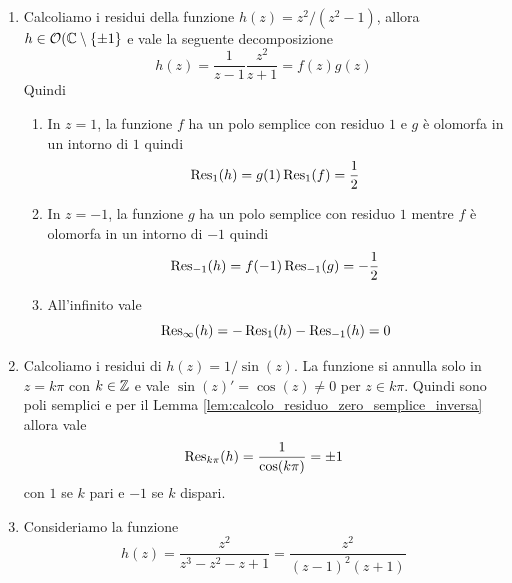 \begin{example}\
  \begin{enumerate}
    \item Calcoliamo i residui della funzione $h(z) = z^2 / (z^2 - 1)$, allora $h
        \in \mathcal{O}(\mathbb{C} \setminus \left\{ \pm 1 \right\}$ e vale la seguente
         decomposizione
         \begin{equation*}
            h(z) = \frac{1}{z-1} \frac{z^2}{z+1} = f(z)g(z)
         \end{equation*}
         Quindi 
         \begin{enumerate}
            \item In $z = 1$, la funzione $f$ ha un polo semplice con residuo $1$ e $g$
                è olomorfa in un intorno di $1$ quindi 
                \begin{equation*}
                    \operatorname{Res}_1(h) = g(1) \operatorname{Res}_1(f) = \frac{1}{2}
                \end{equation*}
            \item In $z = -1$, la funzione $g$ ha un polo semplice con residuo $1$
                mentre $f$ è olomorfa in un intorno di $-1$ quindi 
                \begin{equation*}
                    \operatorname{Res}_{-1}(h) = f(-1) \operatorname{Res}_{-1}(g) = - \frac{1}{2}
                \end{equation*}
            \item All'infinito vale 
                \begin{equation*}
                    \operatorname{Res}_\infty(h) = - \operatorname{Res}_{1}(h) - \operatorname{Res}_{-1}(h) = 0
                \end{equation*}
         \end{enumerate}
       \item Calcoliamo i residui di $h(z) = 1/ \sin(z)$. La funzione si annulla
         solo in $z = k\pi$ con $k \in \mathbb{Z}$ e vale $\sin(z)' = \cos(z) \neq 0$
         per $z \in k \pi$. Quindi sono poli semplici e per il Lemma
         \ref{lem:calcolo_residuo_zero_semplice_inversa} allora vale 
         \begin{equation*}
           \operatorname{Res}_{k\pi}(h) = \frac{1}{\cos(k\pi)} = \pm 1
         \end{equation*}
         con $1$ se $k$ pari e $-1$ se $k$ dispari.
       \item Consideriamo la funzione 
         \begin{equation*}
           h(z) = \frac{z^2}{z^3 - z^2 - z + 1} = \frac{z^2}{(z-1)^2(z+1)}
         \end{equation*}

\end{enumerate}
\end{example}
